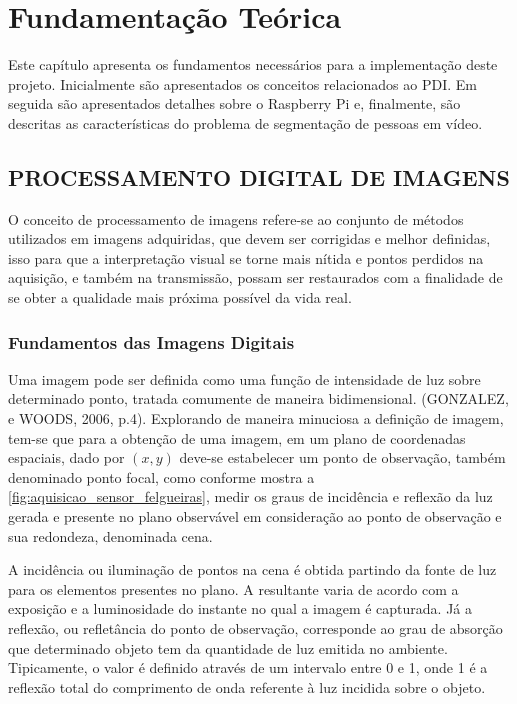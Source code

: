 \documentclass[12pt,oneside,a4paper,chapter=TITLE,section=TITLE,sumario=tradicional]{abntex2}
\begin{document}
\chapter{Fundamentação Teórica}
\label{cap:fundamentacao-teorica}

Este capítulo apresenta os fundamentos necessários para a implementação deste projeto. Inicialmente são apresentados os conceitos relacionados ao PDI. Em seguida são apresentados detalhes sobre o Raspberry Pi e, finalmente, são descritas as características do problema de segmentação de pessoas em vídeo.


\section{PROCESSAMENTO DIGITAL DE IMAGENS}

O conceito de processamento de imagens refere-se ao conjunto de métodos utilizados em imagens adquiridas, que devem ser corrigidas e melhor definidas, isso para que a interpretação visual se torne mais nítida e pontos perdidos na aquisição, e também na transmissão, possam ser restaurados com a finalidade de se obter a qualidade mais próxima possível da vida real.

\subsection{Fundamentos das Imagens Digitais}

Uma imagem pode ser definida como uma função de intensidade de luz sobre determinado ponto, tratada comumente de maneira bidimensional. (GONZALEZ, e WOODS, 2006, p.4). Explorando de maneira minuciosa a definição de imagem, tem-se que para a obtenção de uma imagem, em um plano de coordenadas espaciais, dado por $(x, y)$ deve-se estabelecer um ponto de observação, também denominado ponto focal, como conforme mostra a \autoref{fig:aquisicao_sensor_felgueiras}, medir os graus de incidência e reflexão da luz gerada e presente no plano observável em consideração ao ponto de observação e sua redondeza, denominada cena.

A incidência ou iluminação de pontos na cena é obtida partindo da fonte de luz para os elementos presentes no plano. A resultante varia de acordo com a exposição e a luminosidade do instante no qual a imagem é capturada. Já a reflexão, ou refletância do ponto de observação, corresponde ao grau de absorção que determinado objeto tem da quantidade de luz emitida no ambiente. Tipicamente, o valor é definido através de um intervalo entre 0 e 1, onde 1 é a reflexão total do comprimento de onda referente à luz incidida sobre o objeto.
\end{document}
